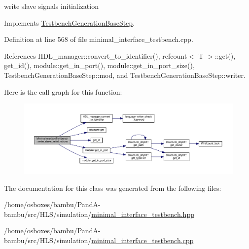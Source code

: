 write slave signals initialization 

Implements \hyperlink{classTestbenchGenerationBaseStep_ae67ccd4b5e09cbd14bd2218330161d3e}{Testbench\+Generation\+Base\+Step}.



Definition at line 568 of file minimal\+\_\+interface\+\_\+testbench.\+cpp.



References H\+D\+L\+\_\+manager\+::convert\+\_\+to\+\_\+identifier(), refcount$<$ T $>$\+::get(), get\+\_\+id(), module\+::get\+\_\+in\+\_\+port(), module\+::get\+\_\+in\+\_\+port\+\_\+size(), Testbench\+Generation\+Base\+Step\+::mod, and Testbench\+Generation\+Base\+Step\+::writer.

Here is the call graph for this function\+:
\nopagebreak
\begin{figure}[H]
\begin{center}
\leavevmode
\includegraphics[width=350pt]{d0/dba/classMinimalInterfaceTestbench_a1bf1863909ba155e241745c78f6e3c03_cgraph}
\end{center}
\end{figure}


The documentation for this class was generated from the following files\+:\begin{DoxyCompactItemize}
\item 
/home/osboxes/bambu/\+Pand\+A-\/bambu/src/\+H\+L\+S/simulation/\hyperlink{minimal__interface__testbench_8hpp}{minimal\+\_\+interface\+\_\+testbench.\+hpp}\item 
/home/osboxes/bambu/\+Pand\+A-\/bambu/src/\+H\+L\+S/simulation/\hyperlink{minimal__interface__testbench_8cpp}{minimal\+\_\+interface\+\_\+testbench.\+cpp}\end{DoxyCompactItemize}
